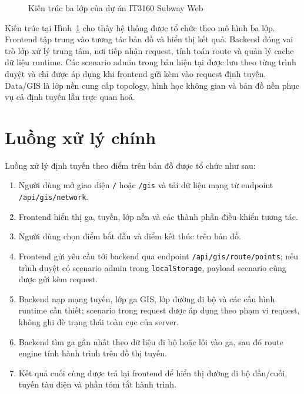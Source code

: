 \documentclass[../DoAn.tex]{subfiles}
\begin{document}
\begin{figure}[H]
\caption{Kiến trúc ba lớp của dự án IT3160 Subway Web}
\label{fig:subway_architecture}
\end{figure}

Kiến trúc tại Hình~\ref{fig:subway_architecture} cho thấy hệ thống được tổ chức theo mô hình ba lớp.
Frontend tập trung vào tương tác bản đồ và hiển thị kết quả.
Backend đóng vai trò lớp xử lý trung tâm, nơi tiếp nhận request, tính toán route và quản lý cache dữ liệu runtime. Các scenario admin trong bản hiện tại được lưu theo từng trình duyệt và chỉ được áp dụng khi frontend gửi kèm vào request định tuyến.
Data/GIS là lớp nền cung cấp topology, hình học không gian và bản đồ nền phục vụ cả định tuyến lẫn trực quan hoá.

\section{Luồng xử lý chính}
Luồng xử lý định tuyến theo điểm trên bản đồ được tổ chức như sau:
\begin{enumerate}
    \item Người dùng mở giao diện \texttt{/} hoặc \texttt{/gis} và tải dữ liệu mạng từ endpoint \texttt{/api/gis/network}.
    \item Frontend hiển thị ga, tuyến, lớp nền và các thành phần điều khiển tương tác.
    \item Người dùng chọn điểm bắt đầu và điểm kết thúc trên bản đồ.
    \item Frontend gửi yêu cầu tới backend qua endpoint \texttt{/api/gis/route/points}; nếu trình duyệt có scenario admin trong \texttt{localStorage}, payload scenario cũng được gửi kèm request.
    \item Backend nạp mạng tuyến, lớp ga GIS, lớp đường đi bộ và các cấu hình runtime cần thiết; scenario trong request được áp dụng theo phạm vi request, không ghi đè trạng thái toàn cục của server.
    \item Backend tìm ga gần nhất theo dữ liệu đi bộ hoặc lối vào ga, sau đó route engine tính hành trình trên đồ thị tuyến.
    \item Kết quả cuối cùng được trả lại frontend để hiển thị đường đi bộ đầu/cuối, tuyến tàu điện và phần tóm tắt hành trình.
\end{enumerate}
\end{document}
